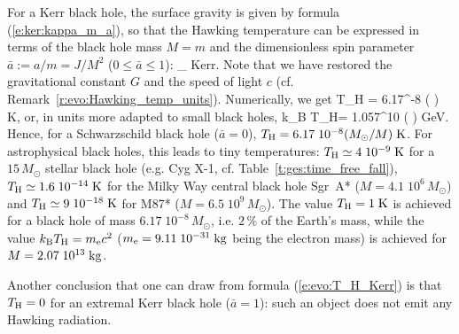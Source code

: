 For a Kerr black hole, the surface gravity is given by formula (\ref{e:ker:kappa_m_a}),
so that the Hawking temperature can be expressed in terms
of the black hole mass $M=m$ and the dimensionless spin parameter
$\bar{a} := a/m = J/M^2$ ($0\leq \bar{a}\leq 1$):
\be \label{e:evo:T_H_Kerr}
    _{\rm\; Kerr}.
\ee
Note that we have restored the gravitational constant $G$ and the speed of light $c$
(cf. Remark~\ref{r:evo:Hawking_temp_units}). Numerically, we get
\be
    T_{\rm H} = 6.17^{-8} \left(  \right)
     {\rm\; K},
\ee
or, in units more adapted to small black holes,
\be
    k_{\rm B} T_{\rm H}= 1.057^{10} \left(  \right)
     {\rm\; GeV}.
\ee
Hence, for a Schwarzschild black hole ($\bar{a}=0$),
$T_{\rm H} = 6.17\; 10^{-8} ({M_\odot}/{M}) {\rm\; K}$. For astrophysical black holes,
this leads to tiny temperatures: $T_{\rm H} \simeq 4\; 10^{-9} {\rm\; K}$
for a $15 \, M_\odot$ stellar black hole (e.g. Cyg X-1, cf. Table~\ref{t:ges:time_free_fall}),
$T_{\rm H} \simeq 1.6\; 10^{-14} {\rm\; K}$ for the Milky Way central black hole Sgr~A*
($M=4.1\; 10^{6} \, M_\odot$)
and $T_{\rm H} \simeq 9\; 10^{-18} {\rm\; K}$ for M87*
($M=6.5\; 10^{9} \, M_\odot$). The value $T_{\rm H} = 1 {\rm\; K}$ is achieved
for a black hole of mass $6.17\; 10^{-8} \, M_\odot$, i.e. $2\, \%$ of the
Earth's mass, while the value $k_{\rm B} T_{\rm H} = m_{\rm e} c^2$
($m_{\rm e} = 9.11\; 10^{-31}\; {\rm kg}$ being the electron mass) is achieved
for $M = 2.07\; 10^{13}\; {\rm kg}$.

Another conclusion that one can draw from formula (\ref{e:evo:T_H_Kerr}) is
that $T_{\rm H}=0$ for an extremal Kerr black hole ($\bar{a}=1$): such an object does not emit any Hawking radiation.

